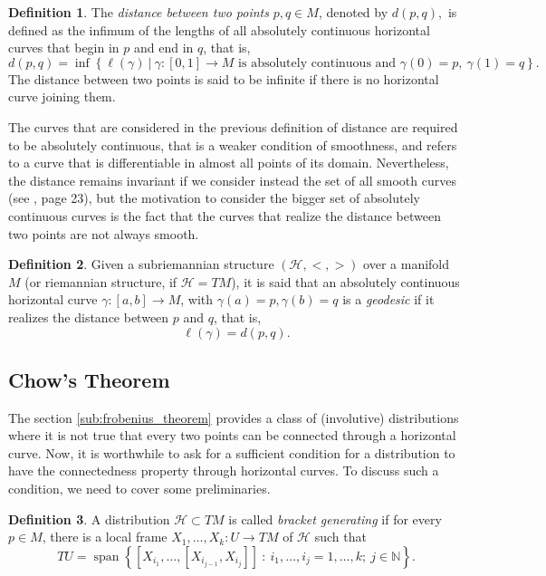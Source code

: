 \documentclass[12pt, letterpaper, reqno]{amsart}
\theoremstyle{definition}
\newtheorem{df}{Definition}
\theoremstyle{plain}
\theoremstyle{remark}
\begin{document}
\begin{df}
	The \textit{distance between two points} $ p,q\in M $, denoted by $ d(p,q), $   is defined as the infimum of the lengths of all absolutely continuous horizontal curves that begin in $ p $ and end in $ q $, that is, 
$$ d(p,q) = \operatorname{inf} \left\{ \ell(\gamma) \ |\ \gamma:[0,1] \rightarrow {M} \text{ is absolutely continuous and }\gamma(0)=p, \ \gamma(1)=q \right\}. $$ 
The distance between two points is said to be infinite if there is no horizontal curve joining them.
\end{df}

The curves that are considered in the previous definition of distance are required to be absolutely continuous, that is a weaker condition of smoothness, and refers to a curve that is differentiable in almost all points of its domain. Nevertheless, the distance remains invariant if we consider instead the set of all smooth curves (see \cite{montgomery2002tour}, page 23), but the motivation to consider the bigger set of absolutely continuous curves is the fact that the curves that realize the distance between two points are not always smooth.

\begin{df}
	Given a subriemannian structure $ (\mathcal{H}, <,>) $ over a manifold $ M $  (or riemannian structure, if $ \mathcal{H}=TM $), it is said that an absolutely continuous horizontal curve $ \gamma:  [a,b] \rightarrow M$, with $ \gamma(a)=p, \gamma(b)=q $ is a \textit{geodesic} if it realizes the distance between $ p $ and $ q $, that is,   
	$$ \ell(\gamma)= d(p,q). $$ 
\end{df}


\subsection{Chow's Theorem}%
\label{sub:chow_s_theorem}

The section \ref{sub:frobenius_theorem} provides a class of (involutive) distributions where it is not true that every two points can be connected through a horizontal curve.  Now, it is worthwhile to ask for a sufficient condition for a distribution to have the connectedness property through horizontal curves. To discuss such a condition, we need to cover some preliminaries. 

\begin{df}
	A distribution $ \mathcal{H}\subset TM $ is called \textit{bracket generating} if for every $ p\in M $, there is a local frame $ X_1,\dots,X_k: U \rightarrow {TM} $ of $ \mathcal{H} $ such that 
	$$ TU = \operatorname{span}\left\{ [X_{i_1},\dots,[X_{i_{j-1}},X_{i_j}]]\ : \ i_1,\dots,i_j=1,\dots,k;\ j\in \mathbb{N} \right\}.  $$ 
\end{df}
\end{document}
